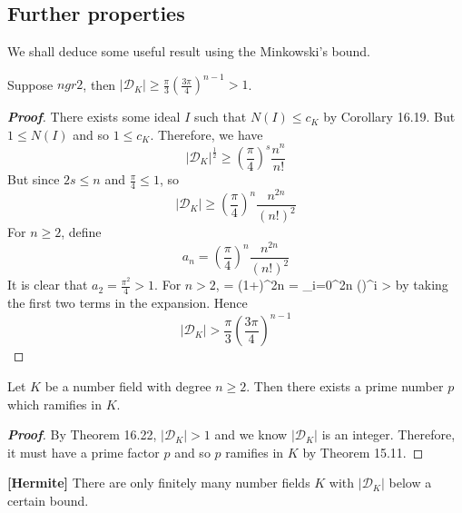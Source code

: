 \subsection{Further properties}

We shall deduce some useful result using the Minkowski's bound.

\begin{theorem} 
Suppose $n gr 2$, then $|\mathcal{D}_K| \ge \frac{\pi}{3}(\frac{3\pi}{4})^{n-1}>1$.
\end{theorem}

\begin{proof}[\bf Proof] There exists some ideal $I$ such that $N(I) \le c_K$ by Corollary 16.19. But $1 \le N(I)$ and so
$1 \le c_K$. Therefore, we have
$$|\mathcal{D}_K|^{\frac{1}{2}} \ge \left(\frac{\pi}{4}\right)^s \frac{n^n}{n!}$$
But since $2s \le n$ and $\frac{\pi}{4} \le 1$, so
$$|\mathcal{D}_K| \ge \left(\frac{\pi}{4}\right)^n \frac{n^{2n}}{(n!)^2}$$
For $n \ge 2$, define
$$a_n=\left(\frac{\pi}{4}\right)^n \frac{n^{2n}}{(n!)^2}$$
It is clear that $a_2=\frac{\pi^2}{4} >1$.
For $n>2$,
\be
{} = \left(1+\right)^{2n} = \sum_{i=0}^2n  \left(\right)^i > 
\ee
by taking the first two terms in the expansion.
Hence
$$|\mathcal{D}_K| >\frac{\pi}{3}\left(\frac{3\pi}{4}\right)^{n-1}$$
\end{proof}
\begin{corollary} Let $K$ be a number field with degree $n \ge 2$. Then there exists a prime number $p$ which ramifies in $K$.
\end{corollary}
\begin{proof}[\bf Proof] By Theorem 16.22, $|\mathcal{D}_K| >1$ and we know $|\mathcal{D}_K|$ is an integer. Therefore,
it must have a prime factor $p$ and so $p$ ramifies in $K$ by Theorem 15.11.
\end{proof}
\begin{theorem}{\bf [Hermite]}\label{H;Hermite} There are only finitely many number fields $K$ with $|\mathcal{D}_K|$ below a certain bound.
\end{theorem}
